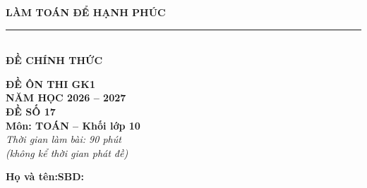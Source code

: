 \documentclass[12pt,a4paper]{article}
\begin{document}
\noindent
\begin{minipage}[c]{0.38\textwidth}
    \centering
    \textbf{LÀM TOÁN ĐỂ HẠNH PHÚC}\\[-2pt]
    \rule{3.2cm}{0.6pt}\\[4pt]
    \textbf{ĐỀ CHÍNH THỨC}
\end{minipage}\hfill
\begin{minipage}[c]{0.35\textwidth}
    \centering
    \textbf{ĐỀ ÔN THI GK1}\\
    \textbf{NĂM HỌC 2026 -- 2027}\\[2pt]
    \textbf{ĐỀ SỐ 17}\\
    \textbf{Môn: TOÁN -- Khối lớp 10}\\
    \textit{\small Thời gian làm bài: 90 phút\\(không kể thời gian phát đề)}
\end{minipage}

\vspace{0.15cm}
\noindent
\begin{minipage}[b]{0.78\textwidth}
    \textbf{Họ và tên:}\dotfill\textbf{SBD:}\makebox[3.5cm]{\dotfill}
\end{minipage}\hfill
\begin{minipage}[b]{0.20\textwidth}
    \hfill
    \setlength{\fboxrule}{0.8pt}%
\end{minipage}
\vspace{0.15cm}
\end{document}
